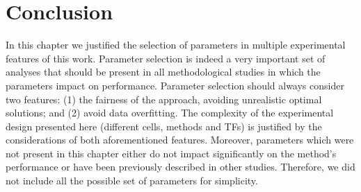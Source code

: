 
\section{Conclusion}
\label{sec:conclusion.5}

In this chapter we justified the selection of parameters in multiple experimental features of this work. Parameter selection is indeed a very important set of analyses that should be present in all methodological studies in which the parameters impact on performance. Parameter selection should always consider two features: (1) the fairness of the approach, avoiding unrealistic optimal solutions; and (2) avoid data overfitting. The complexity of the experimental design presented here (different cells, methods and TFs) is justified by the considerations of both aforementioned features. Moreover, parameters which were not present in this chapter either do not impact significantly on the method's performance or have been previously described in other studies. Therefore, we did not include all the possible set of parameters for simplicity.


